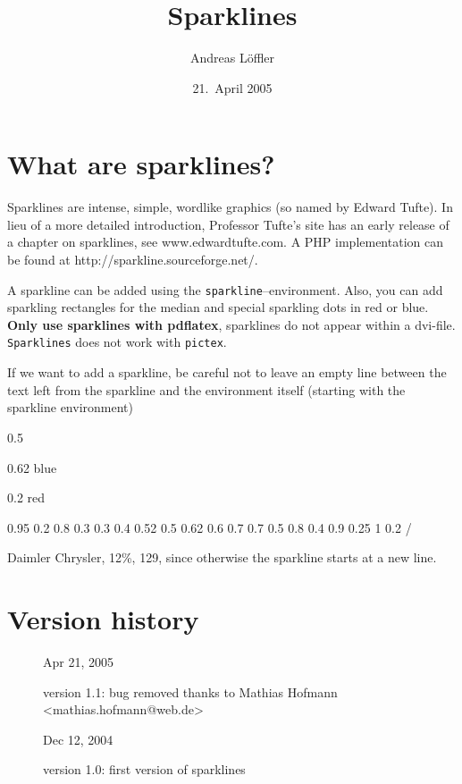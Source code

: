 \documentclass{article}
\begin{document}
\title{Sparklines}
\author{Andreas L\"{o}ffler}
\date{21.~April 2005}\maketitle

\section{What are sparklines?}

 Sparklines are intense, simple, wordlike
graphics (so named by Edward Tufte). In lieu of a more detailed introduction,
Professor Tufte's site has an early release of a chapter on sparklines, see
www.edwardtufte.com. A PHP implementation can be found at
http://sparkline.sourceforge.net/.


A sparkline can be added using the \texttt{sparkline}--environment. Also, you
can add sparkling rectangles for the median and special sparkling dots in red
or blue. \textbf{Only use sparklines with pdflatex}, sparklines do not appear
within a dvi-file. \texttt{Sparklines} does not work with \texttt{pictex}.

If we want to add a sparkline, be careful not to leave an empty line between
the text left from the sparkline and the environment itself (starting with the
sparkline environment)
\begin{sparkline}{10}

 0.5

 0.62 blue

 0.2 red

  0.95 0.2 0.8 0.3 0.3 0.4 0.52 0.5 0.62 0.6 0.7 0.7 0.5 0.8 0.4 0.9 0.25 1 0.2 /
\end{sparkline}
 Daimler Chrysler, 12\%, {\color{red} 129}, since otherwise the sparkline starts
 at a new line.

\section*{Version history}
\begin{description}
\item[] Apr 21, 2005

 version 1.1: bug removed thanks to Mathias Hofmann <mathias.hofmann@web.de>

\item[] Dec 12, 2004

 version 1.0: first version of sparklines
\end{description}
\end{document}
